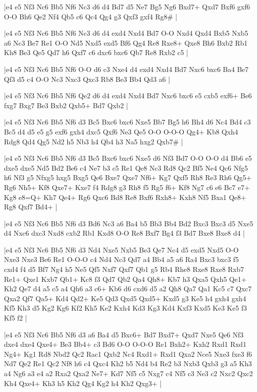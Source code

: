 \whitename{}
\blackname{}
\makegametitle
|e4 e5 Nf3 Nc6 Bb5 Nf6 Nc3 d6 d4 Bd7 d5 Ne7 Bg5 Ng6 Bxd7+ Qxd7 Bxf6 gxf6 O-O Bh6 Qe2 Nf4 Qb5 c6 Qc4 Qg4 g3 Qxf3 gxf4 Rg8\#  |

\whitename{}
\blackname{}
\makegametitle
|e4 e5 Nf3 Nc6 Bb5 Nf6 Nc3 d6 d4 exd4 Nxd4 Bd7 O-O Nxd4 Qxd4 Bxb5 Nxb5 a6 Nc3 Be7 Re1 O-O Nd5 Nxd5 exd5 Bf6 Qg4 Re8 Rxe8+ Qxe8 Bh6 Bxb2 Rb1 Kh8 Be3 Qe5 Qd7 h6 Qxf7 c6 dxc6 bxc6 Qb7 Re8 Rxb2 c5  |

\whitename{}
\blackname{}
\makegametitle
|e4 e5 Nf3 Nc6 Bb5 Nf6 O-O d6 c3 Nxe4 d4 exd4 Nxd4 Bd7 Nxc6 bxc6 Ba4 Be7 Qf3 d5 c4 O-O Nc3 Nxc3 Qxc3 Rb8 Be3 Bb4 Qd3 a6  |

\whitename{}
\blackname{}
\makegametitle
|e4 e5 Nf3 Nc6 Bb5 Nf6 Qe2 d6 d4 exd4 Nxd4 Bd7 Nxc6 bxc6 e5 cxb5 exf6+ Be6 fxg7 Bxg7 Be3 Bxb2 Qxb5+ Bd7 Qxb2  |

\whitename{}
\blackname{}
\makegametitle
|e4 e5 Nf3 Nc6 Bb5 Nf6 d3 Bc5 Bxc6 bxc6 Nxe5 Bb7 Bg5 h6 Bh4 d6 Nc4 Bd4 c3 Bc5 d4 d5 e5 g5 exf6 gxh4 dxc5 Qxf6 Ne3 Qe5 O-O O-O-O Qg4+ Kb8 Qxh4 Rdg8 Qd4 Qg5 Nd2 h5 Nb3 h4 Qb4 h3 Na5 hxg2 Qxb7\#  |

\whitename{}
\blackname{}
\makegametitle
|e4 e5 Nf3 Nc6 Bb5 Nf6 d3 Bc5 Bxc6 bxc6 Nxe5 d6 Nf3 Bd7 O-O O-O d4 Bb6 e5 dxe5 dxe5 Nd5 Bd2 Be6 c4 Ne7 b3 c5 Re1 Qe8 Nc3 Rd8 Qc2 Bf5 Ne4 Qc6 Nfg5 h6 Nf3 g5 Nfxg5 hxg5 Bxg5 Qe6 Bxe7 Qxe7 Nf6+ Kg7 Qxf5 Rh8 Re3 Rh6 Qg5+ Rg6 Nh5+ Kf8 Qxe7+ Kxe7 f4 Rdg8 g3 Rh8 f5 Rg5 f6+ Kf8 Ng7 c6 e6 Bc7 e7+ Kg8 e8=Q+ Kh7 Qe4+ Rg6 Qxc6 Bd8 Re8 Bxf6 Rxh8+ Kxh8 Nf5 Bxa1 Qe8+ Rg8 Qxf7 Bd4+  |

\whitename{}
\blackname{}
\makegametitle
|e4 e5 Nf3 Nc6 Bb5 Nf6 d3 Bd6 Nc3 a6 Ba4 b5 Bb3 Bb4 Bd2 Bxc3 Bxc3 d5 Nxe5 d4 Nxc6 dxc3 Nxd8 cxb2 Rb1 Kxd8 O-O Re8 Bxf7 Bg4 f3 Bd7 Bxe8 Bxe8 d4  |

\whitename{}
\blackname{}
\makegametitle
|e4 e5 Nf3 Nc6 Bb5 Nf6 d3 Nd4 Nxe5 Nxb5 Be3 Qe7 Nc4 d5 exd5 Nxd5 O-O Nxe3 Nxe3 Be6 Re1 O-O-O c4 Nd4 Nc3 Qd7 a4 Bb4 a5 a6 Ra4 Bxc3 bxc3 f5 cxd4 f4 d5 Bf7 Ng4 h5 Ne5 Qf5 Nxf7 Qxf7 Qb1 g5 Rb4 Rhe8 Rxe8 Rxe8 Rxb7 Re1+ Qxe1 Kxb7 Qb1+ Kc8 f3 Qd7 Qb2 Qa4 Qh8+ Kb7 h3 Qxa5 Qxh5 Qe1+ Kh2 Qe7 d4 a5 c5 a4 Qh6 a3 c6+ Kb6 d6 cxd6 d5 a2 Qh8 Qa7 Qa1 Kc5 c7 Qxc7 Qxa2 Qf7 Qa5+ Kd4 Qd2+ Ke5 Qd3 Qxd5 Qxd5+ Kxd5 g3 Ke5 h4 gxh4 gxh4 Kf5 Kh3 d5 Kg2 Kg6 Kf2 Kh5 Ke2 Kxh4 Kd3 Kg3 Kd4 Kxf3 Kxd5 Ke3 Ke5 f3 Kf5 f2  |

\whitename{}
\blackname{}
\makegametitle
|e4 e5 Nf3 Nc6 Bb5 Nf6 d3 a6 Ba4 d5 Bxc6+ Bd7 Bxd7+ Qxd7 Nxe5 Qe6 Nf3 dxe4 dxe4 Qxe4+ Be3 Bb4+ c3 Bd6 O-O O-O-O Re1 Bxh2+ Kxh2 Rxd1 Rxd1 Ng4+ Kg1 Rd8 Nbd2 Qc2 Rac1 Qxb2 Nc4 Rxd1+ Rxd1 Qxa2 Nce5 Nxe3 fxe3 f6 Nd7 Qe2 Re1 Qc2 Nf8 h6 c4 Qxc4 Kh2 b5 Nd4 b4 Re2 b3 Nxb3 Qxb3 g3 a5 Kh3 a4 Ng6 a3 e4 a2 Rxa2 Qxa2 Ne7+ Kd7 Nf5 c5 Nxg7 c4 Nf5 c3 Ne3 c2 Nxc2 Qxc2 Kh4 Qxe4+ Kh3 h5 Kh2 Qg4 Kg2 h4 Kh2 Qxg3+  |

